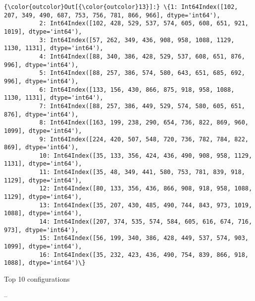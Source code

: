\documentclass[11pt]{article}
\begin{document}
\begin{Verbatim}[commandchars=\\\{\}]
{\color{outcolor}Out[{\color{outcolor}13}]:} \{1: Int64Index([102, 207, 349, 490, 687, 753, 756, 781, 866, 966], dtype='int64'),
          2: Int64Index([102, 428, 529, 537, 574, 605, 608, 651, 921, 1019], dtype='int64'),
          3: Int64Index([57, 262, 349, 436, 908, 958, 1088, 1129, 1130, 1131], dtype='int64'),
          4: Int64Index([88, 340, 386, 428, 529, 537, 608, 651, 876, 996], dtype='int64'),
          5: Int64Index([88, 257, 386, 574, 580, 643, 651, 685, 692, 996], dtype='int64'),
          6: Int64Index([133, 156, 430, 866, 875, 918, 958, 1088, 1130, 1131], dtype='int64'),
          7: Int64Index([88, 257, 386, 449, 529, 574, 580, 605, 651, 876], dtype='int64'),
          8: Int64Index([163, 199, 238, 290, 654, 736, 822, 869, 960, 1099], dtype='int64'),
          9: Int64Index([224, 420, 507, 548, 720, 736, 782, 784, 822, 869], dtype='int64'),
          10: Int64Index([35, 133, 356, 424, 436, 490, 908, 958, 1129, 1131], dtype='int64'),
          11: Int64Index([35, 48, 349, 441, 580, 753, 781, 839, 918, 1129], dtype='int64'),
          12: Int64Index([80, 133, 356, 436, 866, 908, 918, 958, 1088, 1129], dtype='int64'),
          13: Int64Index([35, 207, 430, 485, 490, 744, 843, 973, 1019, 1088], dtype='int64'),
          14: Int64Index([207, 374, 535, 574, 584, 605, 616, 674, 716, 973], dtype='int64'),
          15: Int64Index([56, 199, 340, 386, 428, 449, 537, 574, 903, 1099], dtype='int64'),
          16: Int64Index([35, 232, 423, 436, 490, 754, 839, 866, 918, 1088], dtype='int64')\}
\end{Verbatim}
            
    Top 10 configurations

--
\end{document}
